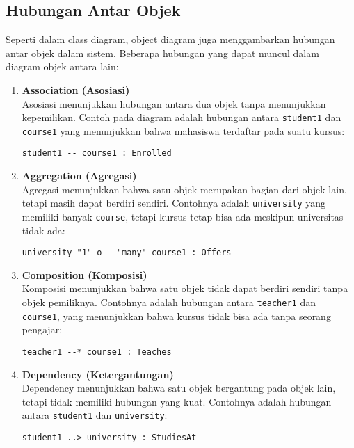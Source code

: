\subsection{Hubungan Antar Objek}
Seperti dalam class diagram, object diagram juga menggambarkan hubungan antar objek dalam sistem. Beberapa hubungan yang dapat muncul dalam diagram objek antara lain:

\begin{enumerate}
	\item \textbf{Association (Asosiasi)} \\
	Asosiasi menunjukkan hubungan antara dua objek tanpa menunjukkan kepemilikan. Contoh pada diagram adalah hubungan antara \texttt{student1} dan \texttt{course1} yang menunjukkan bahwa mahasiswa terdaftar pada suatu kursus:
	\begin{lstlisting}[language=puml]
		student1 -- course1 : Enrolled
	\end{lstlisting}
	
	\item \textbf{Aggregation (Agregasi)} \\
	Agregasi menunjukkan bahwa satu objek merupakan bagian dari objek lain, tetapi masih dapat berdiri sendiri. Contohnya adalah \texttt{university} yang memiliki banyak \texttt{course}, tetapi kursus tetap bisa ada meskipun universitas tidak ada:
	\begin{lstlisting}[language=puml]
		university "1" o-- "many" course1 : Offers
	\end{lstlisting}
	
	\item \textbf{Composition (Komposisi)} \\
	Komposisi menunjukkan bahwa satu objek tidak dapat berdiri sendiri tanpa objek pemiliknya. Contohnya adalah hubungan antara \texttt{teacher1} dan \texttt{course1}, yang menunjukkan bahwa kursus tidak bisa ada tanpa seorang pengajar:
	\begin{lstlisting}[language=puml]
		teacher1 --* course1 : Teaches
	\end{lstlisting}
	
	\item \textbf{Dependency (Ketergantungan)} \\
	Dependency menunjukkan bahwa satu objek bergantung pada objek lain, tetapi tidak memiliki hubungan yang kuat. Contohnya adalah hubungan antara \texttt{student1} dan \texttt{university}:
	\begin{lstlisting}[language=puml]
		student1 ..> university : StudiesAt
	\end{lstlisting}
\end{enumerate}

